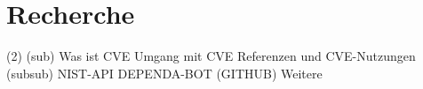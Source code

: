\section{Recherche} \label{sec:Recherche}
    (2)
    (sub)
    Was ist CVE
    Umgang mit CVE
    Referenzen und CVE-Nutzungen
        (subsub)
        NIST-API
        DEPENDA-BOT (GITHUB)
        Weitere